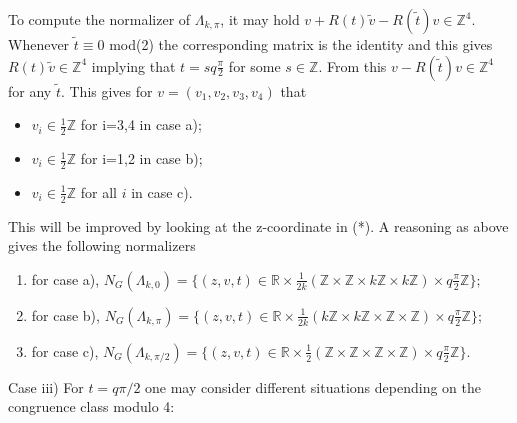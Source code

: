 \documentclass[11pt]{amsart}
\theoremstyle{plain}
\theoremstyle{definition}
\theoremstyle{remark}
\begin{document}
  To compute the normalizer of $\Lambda_{k,\pi}$, it may hold
  $v+R(t)\tilde{v}-R(\tilde{t})v\in \mathbb Z^4.$ Whenever  $\tilde{t}\equiv 0$ mod(2) the corresponding matrix is the identity and this gives  $R(t)\tilde{v}\in \mathbb Z^4$ implying that $t=sq\frac{\pi}2$ for some $s\in \mathbb Z$. From this $v-R(\tilde{t})v\in \mathbb Z^4$ for any $\tilde{t}$. This gives
  for $v=(v_1,v_2,v_3,v_4)$ that
  \begin{itemize}
  	\item $v_i\in \frac12 \mathbb Z$ for i=3,4 in case a);
  	\item  $v_i\in \frac12 \mathbb Z$ for i=1,2 in case b);
  	\item $v_i\in \frac12 \mathbb Z$ for all $i$ in case c).
  \end{itemize}
This will be improved by looking at the z-coordinate in (*). A reasoning as above gives the following normalizers
\begin{enumerate}
	\item for case a),  $N_G(\Lambda_{k,0})=\{(z,v,t)\in \mathbb R\times \frac{1}{2k}(\mathbb Z\times \mathbb Z \times k\mathbb Z \times k\mathbb Z) \times q\frac{\pi}2\mathbb Z\};$
	\item  for case b),  $N_G(\Lambda_{k,\pi})=\{(z,v,t)\in \mathbb R\times \frac{1}{2k}(k\mathbb Z\times k\mathbb Z \times \mathbb Z \times \mathbb Z) \times q\frac{\pi}2\mathbb Z\};$
		\item  for case c),  $N_G(\Lambda_{k,\pi/2})=\{(z,v,t)\in \mathbb R\times \frac{1}{2}(\mathbb Z\times \mathbb Z \times \mathbb Z \times \mathbb Z) \times q\frac{\pi}2\mathbb Z\}.$
	\end{enumerate}

 
  Case iii)   For $t=q \pi/2$ one may consider different situations depending on the congruence class modulo 4:
   
\end{document}
